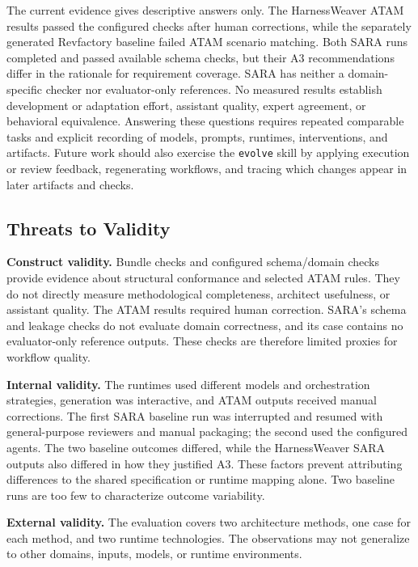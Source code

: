 \documentclass[10pt,conference]{IEEEtran}
\begin{document}
The current evidence gives descriptive answers only. The HarnessWeaver ATAM results passed the configured checks after human corrections, while the separately generated Revfactory baseline failed ATAM scenario matching. Both SARA runs completed and passed available schema checks, but their A3 recommendations differ in the rationale for requirement coverage. SARA has neither a domain-specific checker nor evaluator-only references. No measured results establish development or adaptation effort, assistant quality, expert agreement, or behavioral equivalence. Answering these questions requires repeated comparable tasks and explicit recording of models, prompts, runtimes, interventions, and artifacts. Future work should also exercise the \texttt{evolve} skill by applying execution or review feedback, regenerating workflows, and tracing which changes appear in later artifacts and checks.

\subsection{Threats to Validity}

\textbf{Construct validity.} Bundle checks and configured schema/domain checks provide evidence about structural conformance and selected ATAM rules. They do not directly measure methodological completeness, architect usefulness, or assistant quality. The ATAM results required human correction. SARA's schema and leakage checks do not evaluate domain correctness, and its case contains no evaluator-only reference outputs. These checks are therefore limited proxies for workflow quality.

\textbf{Internal validity.} The runtimes used different models and orchestration strategies, generation was interactive, and ATAM outputs received manual corrections. The first SARA baseline run was interrupted and resumed with general-purpose reviewers and manual packaging; the second used the configured agents. The two baseline outcomes differed, while the HarnessWeaver SARA outputs also differed in how they justified A3. These factors prevent attributing differences to the shared specification or runtime mapping alone. Two baseline runs are too few to characterize outcome variability.

\textbf{External validity.} The evaluation covers two architecture methods, one case for each method, and two runtime technologies. The observations may not generalize to other domains, inputs, models, or runtime environments.
\end{document}
